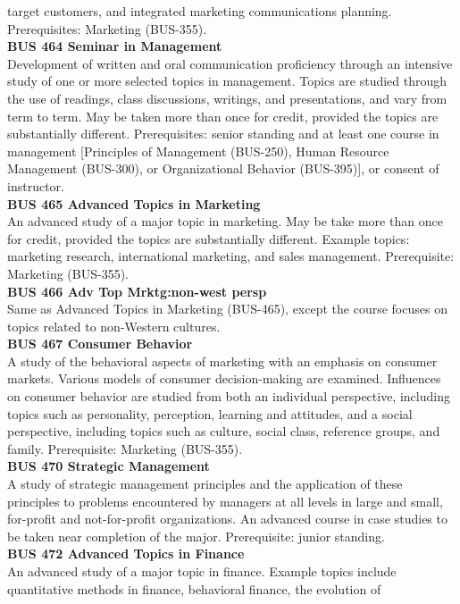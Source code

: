 \documentclass[
  letterpaper,
]{scrbook}
\begin{document}
target customers, and integrated marketing communications planning.
Prerequisites: Marketing (BUS-355).\\
\textbf{BUS 464 Seminar in Management}\\
Development of written and oral communication proficiency through an
intensive study of one or more selected topics in management. Topics are
studied through the use of readings, class discussions, writings, and
presentations, and vary from term to term. May be taken more than once
for credit, provided the topics are substantially different.
Prerequisites: senior standing and at least one course in management
{[}Principles of Management (BUS-250), Human Resource Management
(BUS-300), or Organizational Behavior (BUS-395){]}, or consent of
instructor.\\
\textbf{BUS 465 Advanced Topics in Marketing}\\
An advanced study of a major topic in marketing. May be take more than
once for credit, provided the topics are substantially different.
Example topics: marketing research, international marketing, and sales
management. Prerequisite: Marketing (BUS-355).\\
\textbf{BUS 466 Adv Top Mrktg:non-west persp}\\
Same as Advanced Topics in Marketing (BUS-465), except the course
focuses on topics related to non-Western cultures.\\
\textbf{BUS 467 Consumer Behavior}\\
A study of the behavioral aspects of marketing with an emphasis on
consumer markets. Various models of consumer decision-making are
examined. Influences on consumer behavior are studied from both an
individual perspective, including topics such as personality,
perception, learning and attitudes, and a social perspective, including
topics such as culture, social class, reference groups, and family.
Prerequisite: Marketing (BUS-355).\\
\textbf{BUS 470 Strategic Management}\\
A study of strategic management principles and the application of these
principles to problems encountered by managers at all levels in large
and small, for-profit and not-for-profit organizations. An advanced
course in case studies to be taken near completion of the major.
Prerequisite: junior standing.\\
\textbf{BUS 472 Advanced Topics in Finance}\\
An advanced study of a major topic in finance. Example topics include
quantitative methods in finance, behavioral finance, the evolution of
\end{document}
